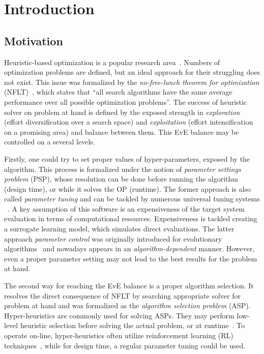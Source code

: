 \chapter{Introduction}\label{intro}

\section{Motivation}
Heuristic-based optimization is a popular research area~\cite{junger2003combinatorial,biegler2004retrospective,festa2014brief}. Numbers of optimization problems are defined, but an ideal approach for their struggling does not exist. This issue was formalized by the \emph{no-free-lunch theorem for optimization} (NFLT)~\cite{wolpert1997no}, which states that ``all search algorithms have the same average performance over all possible optimization problems''. The success of heuristic solver on problem at hand is defined by the exposed strength in \emph{exploration} (effort diversification over a search space) and \emph{exploitation} (effort intensification on a promising area) and balance between them. This EvE balance may be controlled on a several levels. 

Firstly, one could try to set proper values of hyper-parameters, exposed by the algorithm. This process is formalized under the notion of \emph{parameter settings problem} (PSP), whose resolution can be done before running the algorithm (design time), or while it solves the OP (runtime). The former approach is also called \emph{parameter tuning} and can be tackled by numerous universal tuning systems ~\cite{hutter2009paramils,hutter2011sequential,lopez2016irace,falkner2018bohb,brise2spl}. A key assumption of this software is an expensiveness of the target system evaluation in terms of computational resources. Expensiveness is tackled creating a surrogate learning model, which simulates direct evaluations. The latter approach \emph{parameter control} was originally introduced for evolutionary algorithms~\cite{karafotias2014parameter} and nowadays appears in an \emph{algorithm-dependent} manner. However, even a proper parameter setting may not lead to the best results for the problem at hand. 

The second way for reaching the EvE balance is a proper algorithm selection. It resolves the direct consequence of NFLT by searching appropriate solver for problem at hand and was formalized as the \emph{algorithm selection problem} (ASP). Hyper-heuristics are commonly used for solving ASPs. They may perform low-level heuristic selection before solving the actual problem, or at runtime~\cite{burke2019classification}. To operate on-line, hyper-heuristics often utilize reinforcement learning (RL) techniques~\cite{moriarty1999evolutionary,mcclymont2011markov}, while for design time, a regular parameter tuning could be used.

